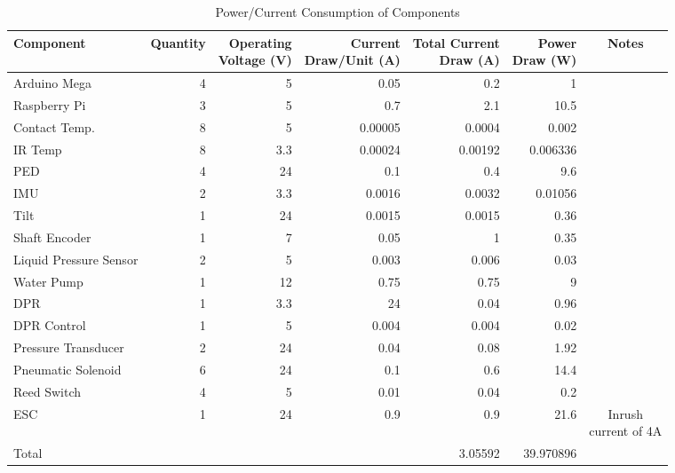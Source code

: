 \documentclass[main.tex]{subfiles}
\begin{document}
    \begin{table}[H]
        \centering
        \begin{tabular}{@{}lrrrrrc@{}} \toprule
            Component & Quantity & \makecell{Operating \\ Voltage (V)} & \makecell{Current \\ Draw/Unit (A)} & \makecell{Total Current \\ Draw (A)} & \makecell{Power \\ Draw (W)} & Notes\\ \midrule
            Arduino Mega & 4 & 5 & 0.05 & 0.2 & 1 &\\
            Raspberry Pi & 3 & 5 & 0.7 & 2.1 & 10.5 &\\
            Contact Temp. & 8 & 5 & 0.00005 & 0.0004 & 0.002 &\\
            IR Temp & 8 & 3.3 & 0.00024 & 0.00192 & 0.006336 &\\
            PED & 4 & 24 & 0.1 & 0.4 & 9.6 &\\
            IMU & 2 & 3.3 & 0.0016 & 0.0032 & 0.01056 &\\
            Tilt & 1 & 24 & 0.0015 & 0.0015 & 0.36 &\\
            Shaft Encoder & 1 & 7 & 0.05 & 1 & 0.35 &\\
            Liquid Pressure Sensor & 2 & 5 & 0.003 & 0.006 & 0.03 &\\
            Water Pump & 1 & 12 & 0.75 & 0.75 & 9 &\\
            DPR & 1 & 3.3 & 24 & 0.04 & 0.96 &\\
            DPR Control & 1 & 5 & 0.004 & 0.004 & 0.02 &\\
            Pressure Transducer & 2 & 24 & 0.04 & 0.08 & 1.92 &\\
            Pneumatic Solenoid & 6 & 24 & 0.1 & 0.6 & 14.4 &\\
            Reed Switch & 4 & 5 & 0.01 & 0.04 & 0.2 &\\
            ESC & 1 & 24 & 0.9 & 0.9 & 21.6 & \makecell{Inrush \\ current of 4A}\\ \midrule
            Total & & & & 3.05592 & 39.970896 &\\ \bottomrule
        \end{tabular}
        \caption{Power/Current Consumption of Components}
    \end{table}
    
\end{document}
